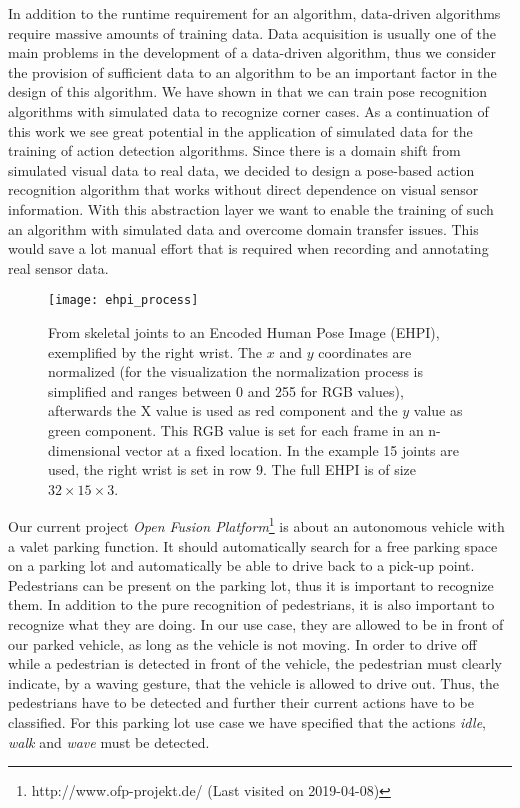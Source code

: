 \documentclass[a4paper, 10pt, conference]{ieeeconf}
\begin{document}
In addition to the runtime requirement for an algorithm, data-driven algorithms require massive amounts of training data. Data acquisition is usually one of the main problems in the development of a data-driven algorithm, thus we consider the provision of sufficient data to an algorithm to be an important factor in the design of this algorithm. We have shown in \cite{ludlUsingSimulationImprove2018} that we can train pose recognition algorithms with simulated data to recognize corner cases. As a continuation of this work we see great potential in the application of simulated data for the training of action detection algorithms. Since there is a domain shift from simulated visual data to real data, we decided to design a pose-based action recognition algorithm that works without direct dependence on visual sensor information. With this abstraction layer we want to enable the training of such an algorithm with simulated data and overcome domain transfer issues. This would save a lot manual effort that is required when recording and annotating real sensor data. 

\begin{figure}
  \centering
  \texttt{[image: ehpi\_process]}
  \caption{From skeletal joints to an Encoded Human Pose Image (EHPI), exemplified by the right wrist. The $x$ and $y$ coordinates are normalized (for the visualization the normalization process is simplified and ranges between 0 and 255 for RGB values), afterwards the X value is used as red component and the $y$ value as green component. This RGB value is set for each frame in an n-dimensional vector at a fixed location. In the example 15 joints are used, the right wrist is set in row 9. The full EHPI is of size $32\times 15\times 3$.}
  \label{fig:ehpi_process}
\end{figure}

Our current project \textit{Open Fusion Platform}\footnote{http://www.ofp-projekt.de/ (Last visited on 2019-04-08)} is about an autonomous vehicle with a valet parking function. It should automatically search for a free parking space on a parking lot and automatically be able to drive back to a pick-up point. Pedestrians can be present on the parking lot, thus it is important to recognize them. In addition to the pure recognition of pedestrians, it is also important to recognize what they are doing. In our use case, they are allowed to be in front of our parked vehicle, as long as the vehicle is not moving. In order to drive off while a pedestrian is detected in front of the vehicle, the pedestrian must clearly indicate, by a waving gesture, that the vehicle is allowed to drive out. Thus, the pedestrians have to be detected and further their current actions have to be classified. For this parking lot use case we have specified that the actions \textit{idle}, \textit{walk} and \textit{wave} must be detected.
\end{document}

